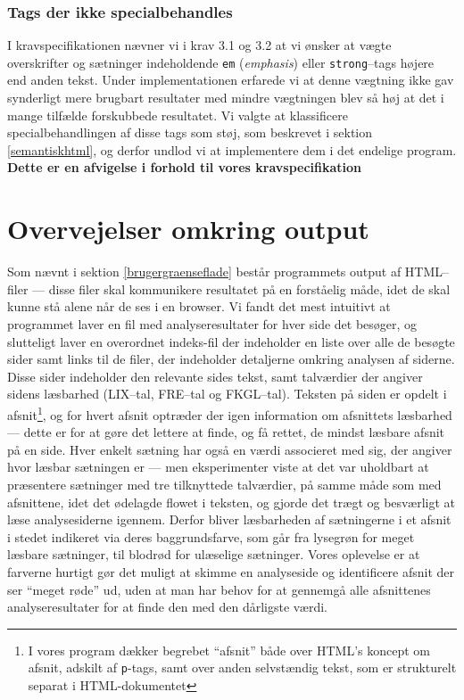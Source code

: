 \documentclass[a4paper,oneside]{memoir}
\begin{document}
\subsubsection{Tags der ikke specialbehandles}
\label{ejspecialbehandling}
I kravspecifikationen nævner vi i krav 3.1 og 3.2 at vi ønsker at
vægte overskrifter og sætninger indeholdende \texttt{em}
(\textit{emphasis}) eller \texttt{strong}--tags højere end anden
tekst. Under implementationen erfarede vi at denne vægtning ikke gav
synderligt mere brugbart resultater med mindre vægtningen blev så høj
at det i mange tilfælde forskubbede resultatet. Vi valgte at
klassificere specialbehandlingen af disse tags som støj, som
beskrevet i sektion \ref{semantiskhtml}, og derfor undlod vi at
implementere dem i det endelige program. \textbf{Dette er en afvigelse
  i forhold til vores kravspecifikation}

\section{Overvejelser omkring output}

Som nævnt i sektion \ref{brugergraenseflade} består programmets output
af HTML--filer --- disse filer skal kommunikere resultatet på en
forståelig måde, idet de skal kunne stå alene når de ses i en
browser. Vi fandt det mest intuitivt at programmet laver en fil med
analyseresultater for hver side det besøger, og slutteligt laver en
overordnet indeks-fil der indeholder en liste over alle de besøgte
sider samt links til de filer, der indeholder detaljerne omkring
analysen af siderne. Disse sider indeholder den relevante sides tekst,
samt talværdier der angiver sidens læsbarhed (LIX--tal, FRE--tal og
FKGL--tal). Teksten på siden er opdelt i afsnit\footnote{I vores
  program dækker begrebet ``afsnit'' både over HTML's koncept om
  afsnit, adskilt af \texttt{p}-tags, samt over anden selvstændig
  tekst, som er strukturelt separat i HTML-dokumentet}, og for hvert
afsnit optræder der igen information om afsnittets læsbarhed --- dette
er for at gøre det lettere at finde, og få rettet, de mindst læsbare
afsnit på en side. Hver enkelt sætning har også en værdi associeret
med sig, der angiver hvor læsbar sætningen er --- men eksperimenter
viste at det var uholdbart at præsentere sætninger med tre tilknyttede
talværdier, på samme måde som med afsnittene, idet det ødelagde flowet
i teksten, og gjorde det trægt og besværligt at læse analysesiderne
igennem. Derfor bliver læsbarheden af sætningerne i et afsnit i stedet
indikeret via deres baggrundsfarve, som går fra lysegrøn for meget
læsbare sætninger, til blodrød for ulæselige sætninger. Vores
oplevelse er at farverne hurtigt gør det muligt at skimme en
analyseside og identificere afsnit der ser ``meget røde'' ud, uden at
man har behov for at gennemgå alle afsnittenes analyseresultater for
at finde den med den dårligste værdi.
\end{document}
